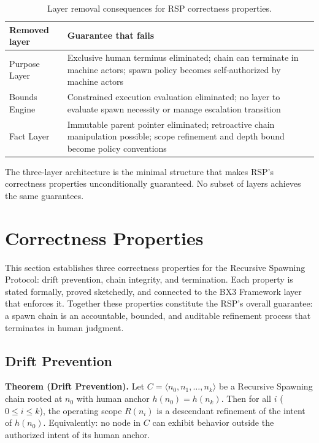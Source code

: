 \begin{table}[h]
\begin{center}
\begin{tabular}{p{3.4cm} p{4.6cm}}
\toprule
\textbf{Removed layer} & \textbf{Guarantee that fails} \\
\midrule
Purpose Layer & Exclusive human terminus eliminated; chain can terminate in machine actors; spawn policy becomes self-authorized by machine actors \\
Bounds Engine & Constrained execution evaluation eliminated; no layer to evaluate spawn necessity or manage escalation transition \\
Fact Layer & Immutable parent pointer eliminated; retroactive chain manipulation possible; scope refinement and depth bound become policy conventions \\
\bottomrule
\end{tabular}
\caption{Layer removal consequences for RSP correctness properties.}
\label{tab:rs-layer-minimality}
\end{center}
\end{table}

The three-layer architecture is the minimal structure that makes RSP's correctness properties unconditionally guaranteed. No subset of layers achieves the same guarantees.

\section{Correctness Properties}
\label{sec:rs-correctness}

This section establishes three correctness properties for the Recursive Spawning Protocol: drift prevention, chain integrity, and termination. Each property is stated formally, proved sketchedly, and connected to the BX3 Framework layer that enforces it. Together these properties constitute the RSP's overall guarantee: a spawn chain is an accountable, bounded, and auditable refinement process that terminates in human judgment.

\subsection{Drift Prevention}
\label{sec:rs-drift-prevention}

\medskip
\noindent\textbf{Theorem (Drift Prevention).} Let $C = \langle n_0, n_1, \ldots, n_k \rangle$ be a Recursive Spawning chain rooted at $n_0$ with human anchor $h(n_0) = h(n_k)$. Then for all $i$ ($0 \leq i \leq k$), the operating scope $R(n_i)$ is a descendant refinement of the intent of $h(n_0)$. Equivalently: no node in $C$ can exhibit behavior outside the authorized intent of its human anchor.

